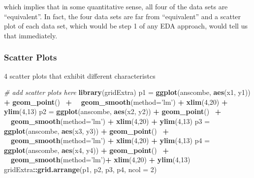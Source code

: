 \documentclass[]{book}
\newenvironment{Shaded}{\begin{snugshade}}{\end{snugshade}}
\newcommand{\KeywordTok}[1]{\textcolor[rgb]{0.13,0.29,0.53}{\textbf{#1}}}
\newcommand{\DataTypeTok}[1]{\textcolor[rgb]{0.13,0.29,0.53}{#1}}
\newcommand{\DecValTok}[1]{\textcolor[rgb]{0.00,0.00,0.81}{#1}}
\newcommand{\StringTok}[1]{\textcolor[rgb]{0.31,0.60,0.02}{#1}}
\newcommand{\CommentTok}[1]{\textcolor[rgb]{0.56,0.35,0.01}{\textit{#1}}}
\newcommand{\OperatorTok}[1]{\textcolor[rgb]{0.81,0.36,0.00}{\textbf{#1}}}
\newcommand{\NormalTok}[1]{#1}
\theoremstyle{definition}
\theoremstyle{definition}
\theoremstyle{definition}
\theoremstyle{remark}
\begin{document}
which implies that in some quantitative sense, all four of the data sets
are ``equivalent''. In fact, the four data sets are far from
``equivalent'' and a scatter plot of each data set, which would be step
1 of any EDA approach, would tell us that immediately.

\subsubsection{Scatter Plots}\label{scatter-plots}

4 scatter plots that exhibit different characteristcs

\begin{Shaded}
\begin{Highlighting}[]
\CommentTok{# add scatter plots here}
\KeywordTok{library}\NormalTok{(gridExtra)}
\NormalTok{p1 =}\StringTok{ }\KeywordTok{ggplot}\NormalTok{(anscombe, }\KeywordTok{aes}\NormalTok{(x1, y1)) }\OperatorTok{+}\StringTok{ }\KeywordTok{geom_point}\NormalTok{()  }\OperatorTok{+}
  \KeywordTok{geom_smooth}\NormalTok{(}\DataTypeTok{method=}\StringTok{'lm'}\NormalTok{) }\OperatorTok{+}\StringTok{ }\KeywordTok{xlim}\NormalTok{(}\DecValTok{4}\NormalTok{,}\DecValTok{20}\NormalTok{) }\OperatorTok{+}\StringTok{ }\KeywordTok{ylim}\NormalTok{(}\DecValTok{4}\NormalTok{,}\DecValTok{13}\NormalTok{)}
\NormalTok{p2 =}\StringTok{ }\KeywordTok{ggplot}\NormalTok{(anscombe, }\KeywordTok{aes}\NormalTok{(x2, y2)) }\OperatorTok{+}\StringTok{ }\KeywordTok{geom_point}\NormalTok{()  }\OperatorTok{+}
  \KeywordTok{geom_smooth}\NormalTok{(}\DataTypeTok{method=}\StringTok{'lm'}\NormalTok{) }\OperatorTok{+}\StringTok{ }\KeywordTok{xlim}\NormalTok{(}\DecValTok{4}\NormalTok{,}\DecValTok{20}\NormalTok{) }\OperatorTok{+}\StringTok{ }\KeywordTok{ylim}\NormalTok{(}\DecValTok{4}\NormalTok{,}\DecValTok{13}\NormalTok{)}
\NormalTok{p3 =}\StringTok{ }\KeywordTok{ggplot}\NormalTok{(anscombe, }\KeywordTok{aes}\NormalTok{(x3, y3)) }\OperatorTok{+}\StringTok{ }\KeywordTok{geom_point}\NormalTok{()  }\OperatorTok{+}
  \KeywordTok{geom_smooth}\NormalTok{(}\DataTypeTok{method=}\StringTok{'lm'}\NormalTok{) }\OperatorTok{+}\StringTok{ }\KeywordTok{xlim}\NormalTok{(}\DecValTok{4}\NormalTok{,}\DecValTok{20}\NormalTok{) }\OperatorTok{+}\StringTok{ }\KeywordTok{ylim}\NormalTok{(}\DecValTok{4}\NormalTok{,}\DecValTok{13}\NormalTok{)}
\NormalTok{p4 =}\StringTok{ }\KeywordTok{ggplot}\NormalTok{(anscombe, }\KeywordTok{aes}\NormalTok{(x4, y4)) }\OperatorTok{+}\StringTok{ }\KeywordTok{geom_point}\NormalTok{()  }\OperatorTok{+}
  \KeywordTok{geom_smooth}\NormalTok{(}\DataTypeTok{method=}\StringTok{'lm'}\NormalTok{)}\OperatorTok{+}\StringTok{ }\KeywordTok{xlim}\NormalTok{(}\DecValTok{4}\NormalTok{,}\DecValTok{20}\NormalTok{) }\OperatorTok{+}\StringTok{ }\KeywordTok{ylim}\NormalTok{(}\DecValTok{4}\NormalTok{,}\DecValTok{13}\NormalTok{)}
 
 
\NormalTok{gridExtra}\OperatorTok{::}\KeywordTok{grid.arrange}\NormalTok{(p1, p2, p3, p4, }\DataTypeTok{ncol =} \DecValTok{2}\NormalTok{)}
\end{Highlighting}
\end{Shaded}
\end{document}
